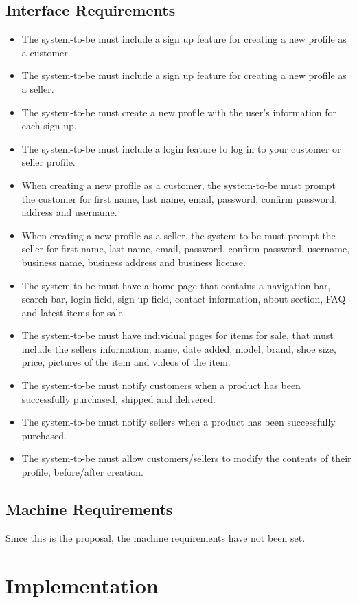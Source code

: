 \subsection{Interface Requirements}
\begin{itemize}
  \item The system-to-be must include a sign up feature for creating a new profile as a customer.
  \item The system-to-be must include a sign up feature for creating a new profile as a seller.
  \item The system-to-be must create a new profile with the user's information for each sign up.
  \item The system-to-be must include a login feature to log in to your customer or seller profile.
  \item When creating a new profile as a customer, the system-to-be must prompt the customer for first name, last name, email, password, confirm password, address and username.
  \item When creating a new profile as a seller, the system-to-be must prompt the seller for first name, last name, email, password, confirm password, username, business name, business address and business license.
  \item The system-to-be must have a home page that contains a navigation bar, search bar, login field, sign up field, contact information, about section, FAQ and latest items for sale.
  \item The system-to-be must have individual pages for items for sale, that must include the sellers information, name, date added, model, brand, shoe size, price, pictures of the item and videos of the item.
  \item The system-to-be must notify customers when a product has been successfully purchased, shipped and delivered.
  \item The system-to-be must notify sellers when a product has been successfully purchased.
  \item The system-to-be must allow customers/sellers to modify the contents of their profile, before/after creation.
\end{itemize}
\subsection{Machine Requirements}
Since this is the proposal, the machine requirements have not been set.
\section{Implementation}

